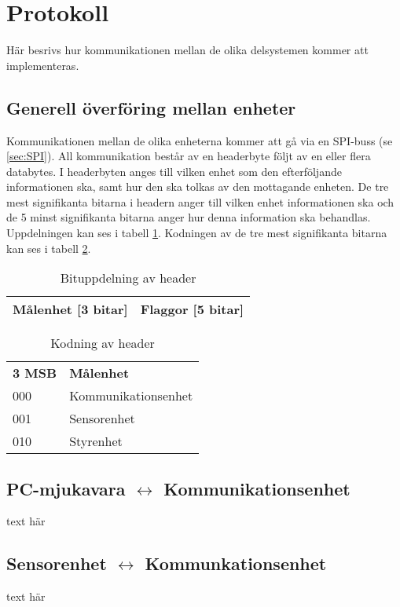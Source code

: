 \section{Protokoll}
Här besrivs hur kommunikationen mellan de olika delsystemen kommer att implementeras.

\subsection{Generell överföring mellan enheter}
Kommunikationen mellan de olika enheterna kommer att gå via en SPI-buss (se \ref{sec:SPI}).
All kommunikation består av en headerbyte följt av en eller flera databytes.
I headerbyten anges till vilken enhet som den efterföljande informationen ska, samt hur den ska tolkas av den mottagande enheten.
De tre mest signifikanta bitarna i headern anger till vilken enhet informationen ska och de 5 minst signifikanta bitarna anger 
hur denna information ska behandlas. Uppdelningen kan ses i tabell \ref{tab:header}.
Kodningen av de tre mest signifikanta bitarna kan ses i tabell \ref{tab:headerkod}.
\begin{table}[hb]
  \centering
  \begin{tabular}{| c | c |}
    \hline
    Målenhet [3 bitar] & Flaggor [5 bitar]\\
    \hline
  \end{tabular}
  \caption{Bituppdelning av header}
  \label{tab:header}
\end{table}

\begin{table}[hb]
  \centering
  \begin{tabular}{l l}
    \textbf{3 MSB} & \textbf{Målenhet} \\
    000 & Kommunikationsenhet \\
    001 & Sensorenhet \\
    010 & Styrenhet \\
  \end{tabular}
  \caption{Kodning av header}
  \label{tab:headerkod}
\end{table}
\subsection{PC-mjukavara $\longleftrightarrow$ Kommunikationsenhet}
text här
\subsection{Sensorenhet $\longleftrightarrow$ Kommunkationsenhet}
text här
